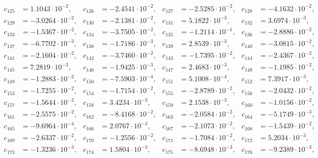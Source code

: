 \begin{align*}
c_{ 125 } &= 1.1043 \cdot 10^{ -2 }, & c_{ 126 } &= -2.4541 \cdot 10^{ -2 }, & c_{ 127 } &= -2.5285 \cdot 10^{ -2 }, & c_{ 128 } &= -4.1632 \cdot 10^{ -2 },\\ 
c_{ 129 } &= -3.0264 \cdot 10^{ -2 }, & c_{ 130 } &= -2.1381 \cdot 10^{ -2 }, & c_{ 131 } &= 5.1822 \cdot 10^{ -3 }, & c_{ 132 } &= 3.6974 \cdot 10^{ -3 },\\ 
c_{ 133 } &= -1.5367 \cdot 10^{ -2 }, & c_{ 134 } &= -3.7505 \cdot 10^{ -2 }, & c_{ 135 } &= -1.2114 \cdot 10^{ -1 }, & c_{ 136 } &= -2.8886 \cdot 10^{ -2 },\\ 
c_{ 137 } &= -6.7702 \cdot 10^{ -3 }, & c_{ 138 } &= -1.7186 \cdot 10^{ -3 }, & c_{ 139 } &= 2.8539 \cdot 10^{ -3 }, & c_{ 140 } &= -3.0815 \cdot 10^{ -2 },\\ 
c_{ 141 } &= -2.1604 \cdot 10^{ -2 }, & c_{ 142 } &= -3.7460 \cdot 10^{ -2 }, & c_{ 143 } &= -1.7395 \cdot 10^{ -2 }, & c_{ 144 } &= -2.4367 \cdot 10^{ -2 },\\ 
c_{ 145 } &= 7.2819 \cdot 10^{ -3 }, & c_{ 146 } &= -1.9425 \cdot 10^{ -3 }, & c_{ 147 } &= 2.4683 \cdot 10^{ -3 }, & c_{ 148 } &= -1.1985 \cdot 10^{ -2 },\\ 
c_{ 149 } &= -1.2883 \cdot 10^{ -2 }, & c_{ 150 } &= -7.5903 \cdot 10^{ -4 }, & c_{ 151 } &= 5.1008 \cdot 10^{ -4 }, & c_{ 152 } &= 7.3917 \cdot 10^{ -3 },\\ 
c_{ 153 } &= -1.7255 \cdot 10^{ -2 }, & c_{ 154 } &= -1.7154 \cdot 10^{ -2 }, & c_{ 155 } &= -2.8789 \cdot 10^{ -2 }, & c_{ 156 } &= -2.0432 \cdot 10^{ -2 },\\ 
c_{ 157 } &= -1.5644 \cdot 10^{ -2 }, & c_{ 158 } &= 3.4234 \cdot 10^{ -3 }, & c_{ 159 } &= 2.1538 \cdot 10^{ -3 }, & c_{ 160 } &= -1.0156 \cdot 10^{ -2 },\\ 
c_{ 161 } &= -2.5575 \cdot 10^{ -2 }, & c_{ 162 } &= -8.4168 \cdot 10^{ -2 }, & c_{ 163 } &= -2.0584 \cdot 10^{ -2 }, & c_{ 164 } &= -5.1749 \cdot 10^{ -3 },\\ 
c_{ 165 } &= -9.6964 \cdot 10^{ -4 }, & c_{ 166 } &= 2.0767 \cdot 10^{ -3 }, & c_{ 167 } &= -2.1073 \cdot 10^{ -2 }, & c_{ 168 } &= -1.5439 \cdot 10^{ -2 },\\ 
c_{ 169 } &= -2.6337 \cdot 10^{ -2 }, & c_{ 170 } &= -1.2556 \cdot 10^{ -2 }, & c_{ 171 } &= -1.7084 \cdot 10^{ -2 }, & c_{ 172 } &= 5.2034 \cdot 10^{ -3 },\\ 
c_{ 173 } &= -1.3236 \cdot 10^{ -3 }, & c_{ 174 } &= 1.5804 \cdot 10^{ -3 }, & c_{ 175 } &= -8.6948 \cdot 10^{ -3 }, & c_{ 176 } &= -9.2389 \cdot 10^{ -3 },\\ 

\end{align*}
